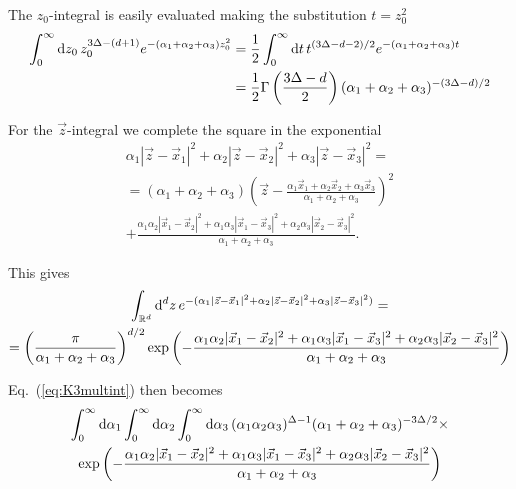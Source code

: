 The $z_0$-integral is easily evaluated making the substitution $t=z_0^2$
\begin{equation*}
\begin{split}
\int_0^\infty \mathrm{d} z_0\, z_0^{3\Delta-(d+1)} e^{-(\alpha_1+\alpha_2+\alpha_3)z_0^2}
&= \frac12 \int_0^\infty \mathrm{d} t\, t^{(3\Delta-d-2)/2} e^{-(\alpha_1+\alpha_2+\alpha_3)t} \\
&= \frac12 \Gamma\left(\frac{3\Delta-d}{2}\right) (\alpha_1+\alpha_2+\alpha_3)^{-(3\Delta-d)/2}
\end{split}
\end{equation*} 

For the $\vec{z}$-integral we complete the square in the exponential
\begin{multline*}
\alpha_1|\vec{z}-\vec{x}_1|^2 + \alpha_2|\vec{z}-\vec{x}_2|^2 + \alpha_3|\vec{z}-\vec{x}_3|^2 = \\
= (\alpha_1+\alpha_2+\alpha_3)
  \left(
         \vec{z} - \frac{ \alpha_1 \vec{x}_1 + 
                          \alpha_2 \vec{x}_2 + 
                          \alpha_3 \vec{x}_3 }
                        { \alpha_1 + \alpha_2 + \alpha_3 }
  \right)^2 \\
+
\frac{ \alpha_1 \alpha_2 |\vec{x}_1-\vec{x}_2|^2 + 
       \alpha_1 \alpha_3 |\vec{x}_1-\vec{x}_3|^2 + 
       \alpha_2 \alpha_3 |\vec{x}_2-\vec{x}_3|^2 }
     { \alpha_1 + \alpha_2 + \alpha_3 }.
\end{multline*}

This gives
\begin{multline*}
\int_{\mathbb{R}^d} \mathrm{d}^d z\, e^{-(\alpha_1|\vec{z}-\vec{x}_1|^2 + \alpha_2|\vec{z}-\vec{x}_2|^2 + \alpha_3|\vec{z}-\vec{x}_3|^2)} = \\
= \left( \frac{\pi}{\alpha_1+\alpha_2+\alpha_3} \right)^{d/2} \exp{\left(-\frac{ \alpha_1 \alpha_2 |\vec{x}_1-\vec{x}_2|^2 + 
       \alpha_1 \alpha_3 |\vec{x}_1-\vec{x}_3|^2 + 
       \alpha_2 \alpha_3 |\vec{x}_2-\vec{x}_3|^2 }
     { \alpha_1 + \alpha_2 + \alpha_3 }\right)}
\end{multline*}

Eq.~(\ref{eq:K3multint}) then becomes
\begin{multline}\label{eq:K3alpha3}
  \int_0^\infty \mathrm{d}\alpha_1
  \int_0^\infty \mathrm{d}\alpha_2
  \int_0^\infty \mathrm{d}\alpha_3\,
    (\alpha_1 \alpha_2 \alpha_3)^{\Delta-1}
    (\alpha_1+\alpha_2+\alpha_3)^{-3\Delta/2} \times \\
  \exp\left(
            -\frac{ \alpha_1 \alpha_2 |\vec{x}_1-\vec{x}_2|^2 + 
                    \alpha_1 \alpha_3 |\vec{x}_1-\vec{x}_3|^2 + 
                    \alpha_2 \alpha_3 |\vec{x}_2-\vec{x}_3|^2 }
                  { \alpha_1 + \alpha_2 + \alpha_3 }
      \right) 
\end{multline}

